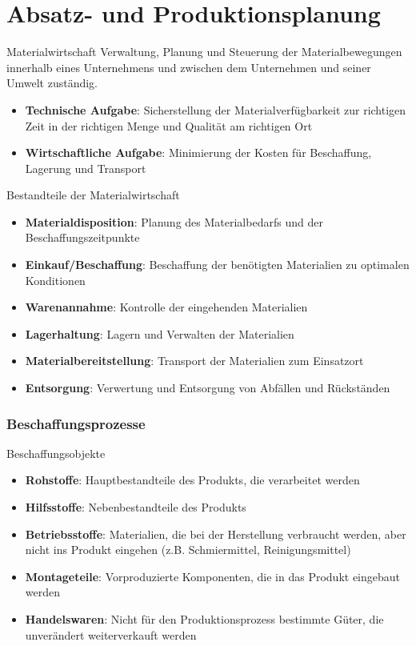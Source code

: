 \section{Absatz- und Produktionsplanung}

\begin{definition}{Materialwirtschaft}
     Verwaltung, Planung und Steuerung der Materialbewegungen innerhalb eines Unternehmens und zwischen dem Unternehmen und seiner Umwelt zuständig. 
\begin{itemize}
    \item \textbf{Technische Aufgabe}: Sicherstellung der Materialverfügbarkeit zur richtigen Zeit in der richtigen Menge und Qualität am richtigen Ort
    \item \textbf{Wirtschaftliche Aufgabe}: Minimierung der Kosten für Beschaffung, Lagerung und Transport
\end{itemize}

\end{definition}

\begin{definition}{Bestandteile der Materialwirtschaft}
\begin{itemize}
    \item \textbf{Materialdisposition}: Planung des Materialbedarfs und der Beschaffungszeitpunkte
    \item \textbf{Einkauf/Beschaffung}: Beschaffung der benötigten Materialien zu optimalen Konditionen
    \item \textbf{Warenannahme}: Kontrolle der eingehenden Materialien
    \item \textbf{Lagerhaltung}: Lagern und Verwalten der Materialien
    \item \textbf{Materialbereitstellung}: Transport der Materialien zum Einsatzort
    \item \textbf{Entsorgung}: Verwertung und Entsorgung von Abfällen und Rückständen
\end{itemize}
\end{definition}

\subsubsection{Beschaffungsprozesse}

\begin{definition}{Beschaffungsobjekte}
\begin{itemize}
    \item \textbf{Rohstoffe}: Hauptbestandteile des Produkts, die verarbeitet werden
    \item \textbf{Hilfsstoffe}: Nebenbestandteile des Produkts
    \item \textbf{Betriebsstoffe}: Materialien, die bei der Herstellung verbraucht werden, aber nicht ins Produkt eingehen (z.B. Schmiermittel, Reinigungsmittel)
    \item \textbf{Montageteile}: Vorproduzierte Komponenten, die in das Produkt eingebaut werden
    \item \textbf{Handelswaren}: Nicht für den Produktionsprozess bestimmte Güter, die unverändert weiterverkauft werden
\end{itemize}
\end{definition}

